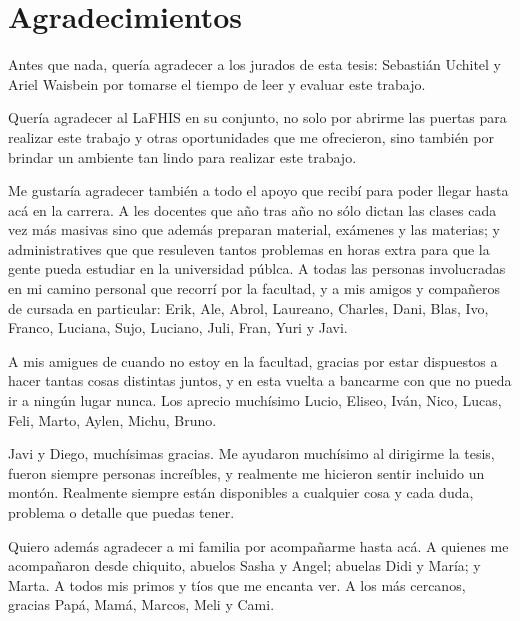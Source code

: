 \chapter*{Agradecimientos}

Antes que nada, quería agradecer a los jurados de esta tesis: Sebastián Uchitel y Ariel Waisbein por tomarse el tiempo de leer y evaluar este trabajo.

Quería agradecer al LaFHIS en su conjunto, no solo por abrirme las puertas para realizar este trabajo y otras oportunidades que me ofrecieron, sino también por brindar un ambiente tan lindo para realizar este trabajo.  

Me gustaría agradecer también a todo el apoyo que recibí para poder llegar hasta acá en la carrera.
A les docentes que año tras año no sólo dictan las clases cada vez más masivas sino que además preparan material, exámenes y las materias; y administratives que que resuleven tantos problemas en horas extra para que la gente pueda estudiar en la universidad públca.
A todas las personas involucradas en mi camino personal que recorrí por la facultad, y a mis amigos y compañeros de cursada en particular: Erik, Ale, Abrol, Laureano, Charles, Dani, Blas, Ivo, Franco, Luciana, Sujo, Luciano, Juli, Fran, Yuri y Javi.

A mis amigues de cuando no estoy en la facultad, gracias por estar dispuestos a hacer tantas cosas distintas juntos, y en esta vuelta a bancarme con que no pueda ir a ningún lugar nunca. Los aprecio muchísimo Lucio, Eliseo, Iván, Nico, Lucas, Feli, Marto, Aylen, Michu, Bruno.

Javi y Diego, muchísimas gracias.
Me ayudaron muchísimo al dirigirme la tesis, fueron siempre personas increíbles, y realmente me hicieron sentir incluido un montón.
Realmente siempre están disponibles a cualquier cosa y cada duda, problema o detalle que puedas tener.

Quiero además agradecer a mi familia por acompañarme hasta acá.
A quienes me acompañaron desde chiquito, abuelos Sasha y Angel; abuelas Didi y María; y Marta.
A todos mis primos y tíos que me encanta ver.
A los más cercanos, gracias Papá, Mamá, Marcos, Meli y Cami. 
